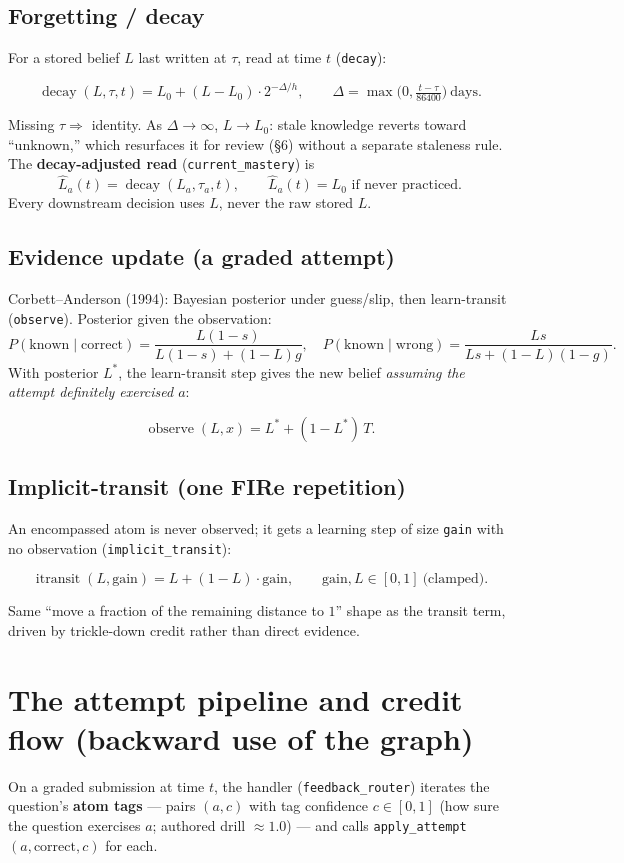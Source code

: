 \documentclass[11pt]{article}
\newcommand{\Lhat}{\hat{L}}
\newcommand{\itransit}{\operatorname{itransit}}
\begin{document}
\subsection{Forgetting / decay}
For a stored belief $L$ last written at $\tau$, read at time $t$ (\texttt{decay}):
\begin{keybox}
\[
  \operatorname{decay}(L,\tau,t) = L_0 + (L-L_0)\cdot 2^{-\Delta/h},
  \qquad \Delta=\max\!\Big(0,\tfrac{t-\tau}{86400}\Big)\ \text{days}.
\]
\end{keybox}
Missing $\tau \Rightarrow$ identity. As $\Delta\to\infty$, $L\to L_0$: stale
knowledge reverts toward ``unknown,'' which resurfaces it for review (\S6)
without a separate staleness rule. The \textbf{decay-adjusted read}
(\texttt{current\_mastery}) is
\[
  \Lhat_a(t) = \operatorname{decay}(L_a,\tau_a,t),\qquad
  \Lhat_a(t)=L_0 \text{ if never practiced.}
\]
Every downstream decision uses $\Lhat$, never the raw stored $L$.

\subsection{Evidence update (a graded attempt)}
Corbett--Anderson (1994): Bayesian posterior under guess/slip, then learn-transit
(\texttt{observe}). Posterior given the observation:
\[
  P(\text{known}\mid\text{correct})=\frac{L(1-s)}{L(1-s)+(1-L)g},\quad
  P(\text{known}\mid\text{wrong})=\frac{Ls}{Ls+(1-L)(1-g)} .
\]
With posterior $L^{\ast}$, the learn-transit step gives the new belief
\emph{assuming the attempt definitely exercised $a$}:
\begin{keybox}
\[
  \operatorname{observe}(L,x) = L^{\ast} + (1-L^{\ast})\,T .
\]
\end{keybox}

\subsection{Implicit-transit (one FIRe repetition)}
An encompassed atom is never observed; it gets a learning step of size
\texttt{gain} with no observation (\texttt{implicit\_transit}):
\begin{keybox}
\[
  \itransit(L,\mathrm{gain}) = L + (1-L)\cdot\mathrm{gain},
  \qquad \mathrm{gain},L \in[0,1]\ \text{(clamped)} .
\]
\end{keybox}
Same ``move a fraction of the remaining distance to $1$'' shape as the transit
term, driven by trickle-down credit rather than direct evidence.

\section{The attempt pipeline and credit flow (backward use of the graph)}
On a graded submission at time $t$, the handler (\texttt{feedback\_router})
iterates the question's \textbf{atom tags} --- pairs $(a,c)$ with tag confidence
$c\in[0,1]$ (how sure the question exercises $a$; authored drill $\approx1.0$) ---
and calls \texttt{apply\_attempt}$(a,\text{correct},c)$ for each.
\end{document}
